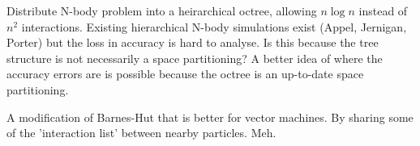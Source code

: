 

Distribute N-body problem into a heirarchical octree, allowing $n \log n$ instead of $n^2$ interactions.
Existing hierarchical N-body simulations exist (Appel, Jernigan, Porter) but the loss in accuracy is hard to analyse. Is this because the tree structure is not necessarily a space partitioning?
A better idea of where the accuracy errors are is possible because the octree is an up-to-date space partitioning.

A modification of Barnes-Hut that is better for vector machines. By sharing some of the 'interaction list' between nearby particles.
Meh.



